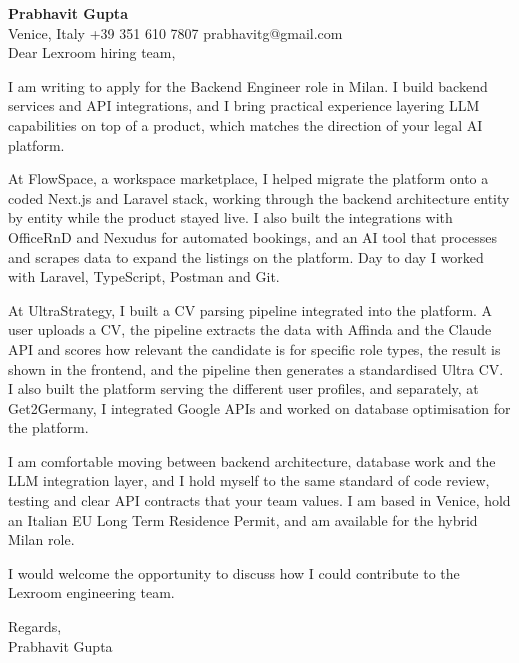 \documentclass[a4paper,10.5pt]{article}
\begin{document}
\textbf{Prabhavit Gupta}\\
Venice, Italy \textbar{} +39 351 610 7807 \textbar{} prabhavitg@gmail.com\\[10pt]
Dear Lexroom hiring team,

I am writing to apply for the Backend Engineer role in Milan. I build backend services and API integrations, and I bring practical experience layering LLM capabilities on top of a product, which matches the direction of your legal AI platform.

At FlowSpace, a workspace marketplace, I helped migrate the platform onto a coded Next.js and Laravel stack, working through the backend architecture entity by entity while the product stayed live. I also built the integrations with OfficeRnD and Nexudus for automated bookings, and an AI tool that processes and scrapes data to expand the listings on the platform. Day to day I worked with Laravel, TypeScript, Postman and Git.

At UltraStrategy, I built a CV parsing pipeline integrated into the platform. A user uploads a CV, the pipeline extracts the data with Affinda and the Claude API and scores how relevant the candidate is for specific role types, the result is shown in the frontend, and the pipeline then generates a standardised Ultra CV. I also built the platform serving the different user profiles, and separately, at Get2Germany, I integrated Google APIs and worked on database optimisation for the platform.

I am comfortable moving between backend architecture, database work and the LLM integration layer, and I hold myself to the same standard of code review, testing and clear API contracts that your team values. I am based in Venice, hold an Italian EU Long Term Residence Permit, and am available for the hybrid Milan role.

I would welcome the opportunity to discuss how I could contribute to the Lexroom engineering team.

Regards,\\
Prabhavit Gupta
\end{document}
